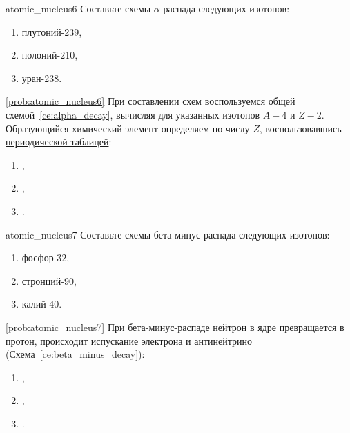 \begin{problem}{}{atomic_nucleus6}
    Составьте схемы $\alpha$-распада следующих изотопов:
    \begin{enumerate}[label=\arabic*)]
        \item плутоний-239,
        \item полоний-210,
        \item уран-238.
    \end{enumerate}

    \begin{sol}{\ref{prob:atomic_nucleus6}}
        При составлении схем воспользуемся общей схемой~\eqref{ce:alpha_decay}, вычисляя для указанных изотопов $A - 4$ и $Z - 2$. Образующийся химический элемент определяем по числу $Z$, воспользовавшись \hyperref[appendix:periodic_table]{периодической таблицей}:
        \begin{enumerate}[label=\arabic*)]
            \item {},
            \item {},
            \item {}.
        \end{enumerate}
    \end{sol}
\end{problem}

\begin{problem}{}{atomic_nucleus7}
    Составьте схемы бета-минус-распада следующих изотопов:
    \begin{enumerate}[label=\arabic*)]
        \item фосфор-32,
        \item стронций-90,
        \item калий-40.
    \end{enumerate}

    \begin{sol}{\ref{prob:atomic_nucleus7}}
        При бета-минус-распаде нейтрон в ядре превращается в протон, происходит испускание электрона и антинейтрино (Схема~\ref{ce:beta_minus_decay}):
        \begin{enumerate}[label=\arabic*)]
            \item {},
            \item {},
            \item {}.
        \end{enumerate}
    \end{sol}
\end{problem}

